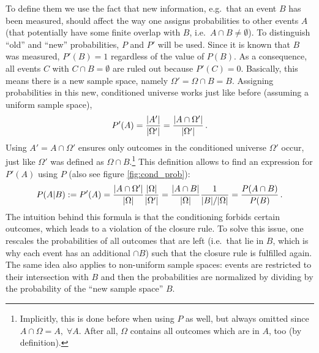 To define them we use the fact that new information, e.g.~that an event $B$ has been measured, should affect the way one assigns probabilities to other events $A$ (that potentially have some finite overlap with $B$, i.e.~$A \cap B \neq \emptyset$). To distinguish \enquote{old} and \enquote{new} probabilities, $P$ and $P'$ will be used. Since it is known that $B$ was measured, $P'(B) = 1$ regardless of the value of $P(B)$. As a consequence, all events $C$ with $C \cap B = \emptyset$ are ruled out because $P'(C) = 0$. Basically, this means there is a new sample space, namely $\Omega' = \Omega \cap B = B$. Assigning probabilities in this new, conditioned universe works just like before (assuming a uniform sample space),
\begin{equation*}
P'(A) = \frac{\abs{A'}}{\abs{\Omega'}} = \frac{\abs{A \cap \Omega'}}{\abs{\Omega'}} \, .
\end{equation*}
Using $A' = A \cap \Omega'$ ensures only outcomes in the conditioned universe $\Omega'$ occur, just like $\Omega'$ was defined as $\Omega \cap B$.\footnote{Implicitly, this is done before when using $P$ as well, but always omitted since $A \cap \Omega = A, \; \forall A$. After all, $\Omega$ contains all outcomes which are in $A$, too (by definition).} This definition allows to find an expression for $P'(A)$ using $P$ (also see figure \ref{fig:cond_prob}):
\begin{equation}
P(A | B) := P'(A) = \frac{\abs{A \cap \Omega'}}{\abs{\Omega}} \frac{\abs{\Omega}}{\abs{\Omega'}} = \frac{\abs{A \cap B}}{\abs{\Omega}} \frac{1}{\abs{B} / \abs{\Omega}} = \frac{P(A \cap B)}{P(B)} \, .
\end{equation}
The intuition behind this formula is that the conditioning forbids certain outcomes, which leads to a violation of the closure rule. To solve this issue, one rescales the probabilities of all outcomes that are left (i.e.~that lie in $B$, which is why each event has an additional $\cap B$) such that the closure rule is fulfilled again. The same idea also applies to non-uniform sample spaces: events are restricted to their intersection with $B$ and then the probabilities are normalized by dividing by the probability of the \enquote{new sample space} $B$.



